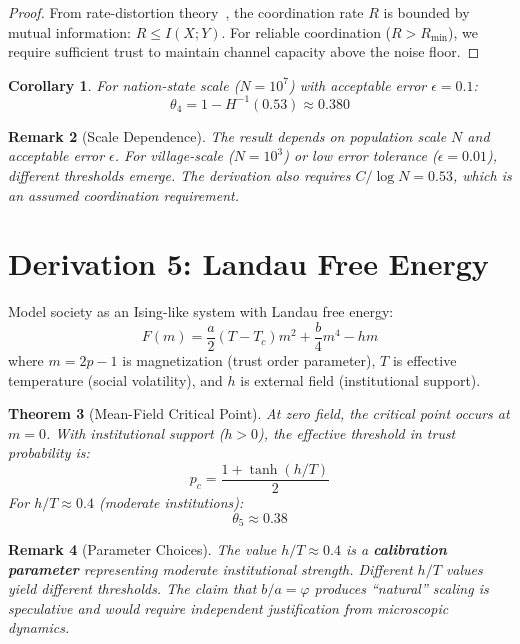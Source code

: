 \documentclass[11pt,twocolumn]{article}
\newtheorem{theorem}{Theorem}[section]
\newtheorem{corollary}[theorem]{Corollary}
\newtheorem{remark}[theorem]{Remark}
\begin{document}
\begin{proof}
From rate-distortion theory~\cite{CsiszarKorner1981}, the coordination rate $R$ is bounded by mutual information: $R \leq I(X;Y)$. For reliable coordination ($R > R_{\min}$), we require sufficient trust to maintain channel capacity above the noise floor.
\end{proof}

\begin{corollary}
For nation-state scale ($N = 10^7$) with acceptable error $\epsilon = 0.1$:
\begin{equation}
\theta_4 = 1 - H^{-1}(0.53) \approx \mathbf{0.380}
\end{equation}
\end{corollary}

\begin{remark}[Scale Dependence]
The result depends on population scale $N$ and acceptable error $\epsilon$. For village-scale ($N = 10^3$) or low error tolerance ($\epsilon = 0.01$), different thresholds emerge. The derivation also requires $C/\log N = 0.53$, which is an assumed coordination requirement.
\end{remark}

\section{Derivation 5: Landau Free Energy}

Model society as an Ising-like system with Landau free energy:
\begin{equation}
F(m) = \frac{a}{2}(T - T_c)m^2 + \frac{b}{4}m^4 - hm
\end{equation}
where $m = 2p - 1$ is magnetization (trust order parameter), $T$ is effective temperature (social volatility), and $h$ is external field (institutional support).

\begin{theorem}[Mean-Field Critical Point]
\label{thm:landau}
At zero field, the critical point occurs at $m = 0$. With institutional support ($h > 0$), the effective threshold in trust probability is:
\begin{equation}
p_c = \frac{1 + \tanh(h/T)}{2}
\end{equation}
For $h/T \approx 0.4$ (moderate institutions):
\begin{equation}
\theta_5 \approx \mathbf{0.38}
\end{equation}
\end{theorem}

\begin{remark}[Parameter Choices]
The value $h/T \approx 0.4$ is a \textbf{calibration parameter} representing moderate institutional strength. Different $h/T$ values yield different thresholds. The claim that $b/a = \varphi$ produces ``natural'' scaling is speculative and would require independent justification from microscopic dynamics.
\end{remark}
\end{document}
